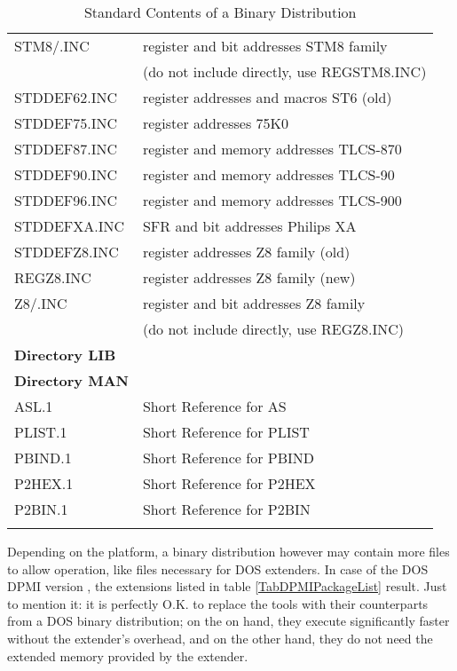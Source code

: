 \documentclass[12pt,twoside]{report}
\begin{document}
\begin{center}
\begin{longtable}{|l|l|}
STM8/\*.INC       & register and bit addresses STM8 family \\
                  & (do not include directly, use REGSTM8.INC) \\
STDDEF62.INC      & register addresses and macros ST6 (old)\\
STDDEF75.INC      & register addresses 75K0 \\
STDDEF87.INC      & register and memory addresses TLCS-870 \\
STDDEF90.INC      & register and memory addresses TLCS-90 \\
STDDEF96.INC      & register and memory addresses TLCS-900 \\
STDDEFXA.INC      & SFR and bit addresses Philips XA \\
STDDEFZ8.INC      & register addresses Z8 family (old) \\
REGZ8.INC         & register addresses Z8 family (new) \\
Z8/\*.INC         & register and bit addresses Z8 family \\
                  & (do not include directly, use REGZ8.INC) \\
\hline
{\bf Directory LIB} & \\
\hline
{\bf Directory MAN} & \\
\hline
ASL.1             & Short Reference for AS \\
PLIST.1           & Short Reference for PLIST \\
PBIND.1           & Short Reference for PBIND \\
P2HEX.1           & Short Reference for P2HEX \\
P2BIN.1           & Short Reference for P2BIN \\
\hline
\caption{Standard Contents of a Binary Distribution
         \label{TabCommonPackageList}}
\end{longtable}\end{center}


Depending on the platform, a binary distribution however may contain more
files to allow operation, like files necessary for DOS extenders. In case
of the DOS DPMI version , the extensions listed in
table \ref{TabDPMIPackageList} result.  Just to mention it: it is
perfectly O.K. to replace the tools with their counterparts from a DOS
binary distribution; on the on hand, they execute significantly faster
without the extender's overhead, and on the other hand, they do not need
the extended memory provided by the extender.
\end{document}
